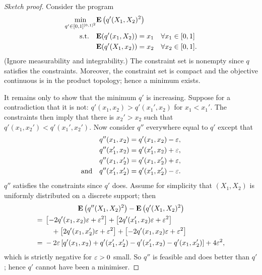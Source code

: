 \documentclass[11pt,letterpaper,reqno,oneside]{article}
\begin{document}
\begin{proof}[Sketch proof]
	Consider the program
	\begin{align*}
		\min_{q' \in [0,1]^{[0,1]^2}} 
		&\mathbf{E}\left( q'(X_1,X_2)^2 \right)
		\\
		\text{s.t.}\quad
		&\mathbf{E}(q'(x_1,X_2)) = x_1 \quad\forall x_1 \in [0,1] 
		\\
		&\mathbf{E}(q'(X_1,x_2)) = x_2 \quad\forall x_2 \in [0,1] .
	\end{align*}
	(Ignore measurability and integrability.) The constraint set is nonempty since $q$ satisfies the constraints. Moreover, the constraint set is compact and the objective continuous is in the product topology; hence a minimum exists.

	It remains only to show that the minimum $q'$ is increasing. Suppose for a contradiction that it is not: $q'(x_1,x_2) > q'(x_1',x_2)$ for $x_1 < x_1'$. The constraints then imply that there is $x_2'>x_2$ such that $q'(x_1,x_2') < q'(x_1',x_2')$. Now consider $q''$ everywhere equal to $q'$ except that
	\begin{align*}
		q''(x_1,x_2)   ={}& q'(x_1,x_2) - \varepsilon , \\
		q''(x_1',x_2)  ={}& q'(x_1',x_2) + \varepsilon , \\
		q''(x_1,x_2')  ={}& q'(x_1,x_2') + \varepsilon , \\ \text{and}\quad
		q''(x_1',x_2') ={}& q'(x_1',x_2') - \varepsilon .
	\end{align*}
	$q''$ satisfies the constraints since $q'$ does. Assume for simplicity that $(X_1,X_2)$ is uniformly distributed on a discrete support; then
	\begin{multline*}
		\mathbf{E}\left( q''(X_1,X_2)^2 \right) - \mathbf{E}\left( q'(X_1,X_2)^2 \right)
		\\
		\begin{aligned}
			={}& \left[ - 2 q'(x_1,x_2) \varepsilon + \varepsilon^2 \right]
			+ \left[ 2 q'(x_1',x_2) \varepsilon + \varepsilon^2 \right]
			\\
			&\quad
			+ \left[ 2 q'(x_1,x_2') \varepsilon + \varepsilon^2 \right]
			+ \left[ - 2 q'(x_1,x_2) \varepsilon + \varepsilon^2 \right]
			\\
			={}& - 2 \varepsilon \left[ q'(x_1,x_2) + q'(x_1',x_2') - q'(x_1',x_2) - q'(x_1,x_2') \right]
			+ 4 \varepsilon^2 ,
		\end{aligned}
	\end{multline*}
	which is strictly negative for $\varepsilon>0$ small. So $q''$ is feasible and does better than $q'$; hence $q'$ cannot have been a minimiser.
\end{proof}
\end{document}
